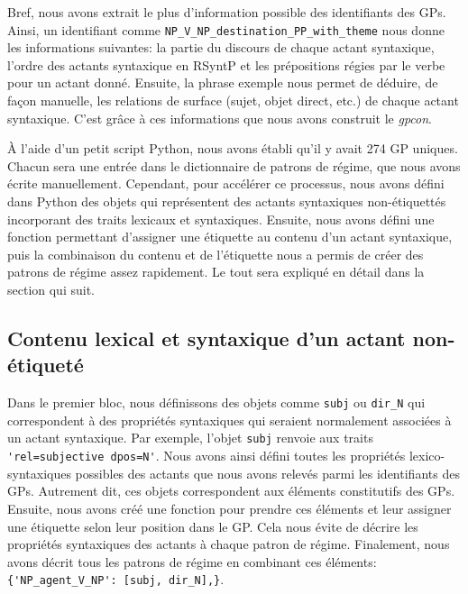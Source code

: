 Bref, nous avons extrait le plus d'information possible des identifiants des \acp{GP}. Ainsi, un identifiant comme \texttt{NP\_V\_NP\_destination\_PP\_with\_theme} nous donne les informations suivantes: la partie du discours de chaque actant syntaxique, l'ordre des actants syntaxique en \ac{RSyntP} et les prépositions régies par le verbe pour un actant donné. Ensuite, la phrase exemple  nous permet de déduire, de façon manuelle, les relations de surface (sujet, objet direct, etc.) de chaque actant syntaxique. C'est grâce à ces informations que nous avons construit le \emph{gpcon}.

À l'aide d'un petit script Python, nous avons établi qu'il y avait 274 \ac{GP} uniques. Chacun sera une entrée dans le dictionnaire de patrons de régime, que nous avons écrite manuellement. Cependant, pour accélérer ce processus, nous avons défini dans Python des objets qui représentent des actants syntaxiques non-étiquettés incorporant des traits lexicaux et syntaxiques. Ensuite, nous avons défini une fonction permettant d'assigner une étiquette au contenu d'un actant syntaxique, puis la combinaison du contenu et de l'étiquette nous a permis de créer des patrons de régime assez rapidement. Le tout sera expliqué en détail dans la section qui suit.

\subsection{Contenu lexical et syntaxique d'un actant non-étiqueté}

Dans le premier bloc, nous définissons des objets comme \texttt{subj} ou \texttt{dir\_N} qui correspondent à des propriétés syntaxiques qui seraient normalement associées à un actant syntaxique. Par exemple, l'objet \texttt{subj} renvoie aux traits \lstinline|'rel=subjective dpos=N'|. Nous avons ainsi défini toutes les propriétés lexico-syntaxiques possibles des actants que nous avons relevés parmi les identifiants des \acp{GP}. Autrement dit, ces objets correspondent aux éléments constitutifs des \acp{GP}. Ensuite, nous avons créé une fonction pour prendre ces éléments et leur assigner une étiquette selon leur position dans le \ac{GP}. Cela nous évite de décrire les propriétés syntaxiques des actants à chaque patron de régime. Finalement, nous avons décrit tous les patrons de régime en combinant ces éléments: \lstinline|{'NP_agent_V_NP': [subj, dir_N],}|.

